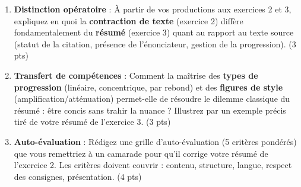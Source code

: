 \documentclass[11pt]{article}
\begin{document}
\begin{exercice}
\begin{enumerate}
    \item \textbf{Distinction opératoire} : À partir de vos productions aux exercices 2 et 3, expliquez en quoi la \textbf{contraction de texte} (exercice 2) diffère fondamentalement du \textbf{résumé} (exercice 3) quant au rapport au texte source (statut de la citation, présence de l'énonciateur, gestion de la progression). (3 pts)
    \item \textbf{Transfert de compétences} : Comment la maîtrise des \textbf{types de progression} (linéaire, concentrique, par rebond) et des \textbf{figures de style} (amplification/atténuation) permet-elle de résoudre le dilemme classique du résumé : \og être concis sans trahir la nuance \fg ? Illustrez par un exemple précis tiré de votre résumé de l'exercice 3. (3 pts)
    \item \textbf{Auto-évaluation} : Rédigez une grille d'auto-évaluation (5 critères pondérés) que vous remettriez à un camarade pour qu'il corrige votre résumé de l'exercice 2. Les critères doivent couvrir : contenu, structure, langue, respect des consignes, présentation. (4 pts)
\end{enumerate}
\end{exercice}
\end{document}
